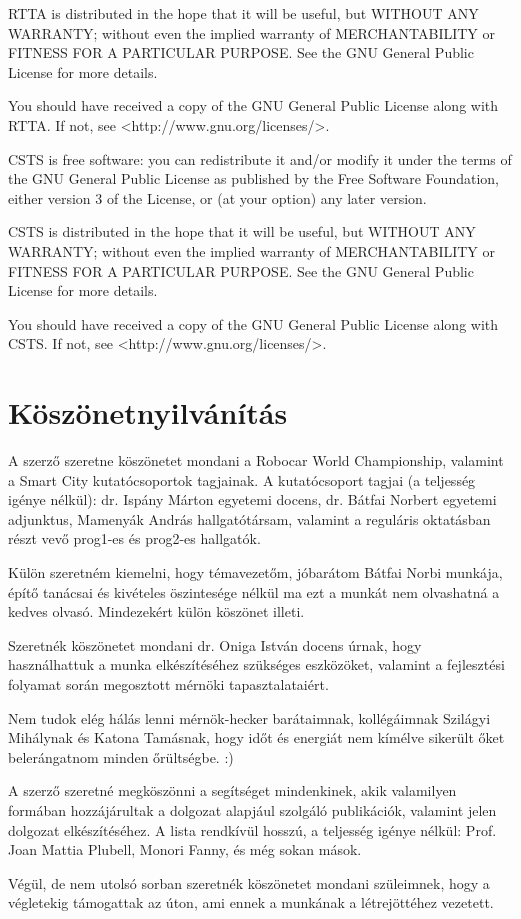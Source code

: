 \documentclass[a4paper,12pt]{report}
\begin{document}
\noindent
RTTA is distributed in the hope that it will be useful,
but WITHOUT ANY WARRANTY; without even the implied warranty of
MERCHANTABILITY or FITNESS FOR A PARTICULAR PURPOSE.  See the
GNU General Public License for more details.

\noindent
You should have received a copy of the GNU General Public License
along with RTTA. If not, see <http://www.gnu.org/licenses/>.

\noindent
CSTS is free software: you can redistribute it and/or modify
it under the terms of the GNU General Public License as published by
the Free Software Foundation, either version 3 of the License, or
(at your option) any later version.

\noindent
CSTS is distributed in the hope that it will be useful,
but WITHOUT ANY WARRANTY; without even the implied warranty of
MERCHANTABILITY or FITNESS FOR A PARTICULAR PURPOSE.  See the
GNU General Public License for more details.

\noindent
You should have received a copy of the GNU General Public License
along with CSTS. If not, see <http://www.gnu.org/licenses/>.

\chapter*{Köszönetnyilvánítás}

\begin{singlespace}

A szerző szeretne köszönetet mondani a Robocar World Championship, valamint a Smart City kutatócsoportok tagjainak. A kutatócsoport tagjai (a teljesség igénye nélkül): dr. Ispány Márton egyetemi docens, dr. Bátfai Norbert egyetemi adjunktus, Mamenyák András hallgatótársam, valamint a reguláris oktatásban részt vevő prog1-es és prog2-es hallgatók.

Külön szeretném kiemelni, hogy témavezetőm, jóbarátom Bátfai Norbi munkája, építő tanácsai és kivételes öszintesége nélkül ma ezt a munkát nem olvashatná a kedves olvasó. Mindezekért külön köszönet illeti.

Szeretnék köszönetet mondani dr. Oniga István docens úrnak, hogy használhattuk a munka elkészítéséhez szükséges eszközöket, valamint a fejlesztési folyamat során megosztott mérnöki tapasztalataiért.

Nem tudok elég hálás lenni mérnök-hecker barátaimnak, kollégáimnak Szilágyi Mihálynak és Katona Tamásnak, hogy időt és energiát nem kímélve sikerült őket belerángatnom minden őrültségbe. :)

A szerző szeretné megköszönni a segítséget mindenkinek, akik valamilyen formában hozzájárultak a dolgozat alapjául szolgáló publikációk, valamint jelen dolgozat elkészítéséhez. A lista rendkívül hosszú, a teljesség igénye nélkül: Prof. Joan Mattia Plubell, Monori Fanny, és még sokan mások.

Végül, de nem utolsó sorban szeretnék köszönetet mondani szüleimnek, hogy a végletekig támogattak az úton, ami ennek a munkának a létrejöttéhez vezetett.

\end{singlespace}
\end{document}
